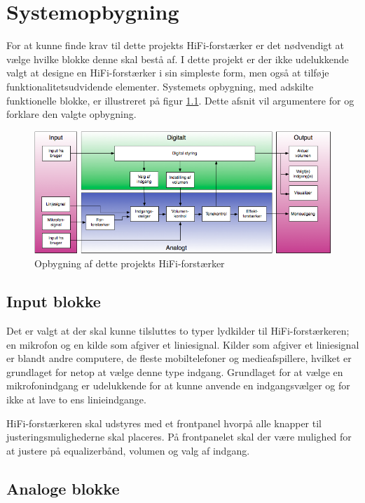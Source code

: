 \chapter{Systemopbygning}
For at kunne finde krav til dette projekts HiFi-forstærker er det nødvendigt at vælge hvilke blokke denne skal bestå af. I dette projekt er der ikke udelukkende valgt at designe en HiFi-forstærker i sin simpleste form, men også at tilføje funktionalitetsudvidende elementer. Systemets opbygning, med adskilte funktionelle blokke, er illustreret på figur \ref{fig:hififorstaerker_opbygning}. Dette afsnit vil argumentere for og forklare den valgte opbygning. 


\begin{figure}[h]
\centering
\includegraphics[scale=0.6]{valg_af_loesning/systemopbygning/forstaerker_opbygning.png}
\caption{Opbygning af dette projekts HiFi-forstærker}
\label{fig:hififorstaerker_opbygning}
\end{figure}


\section*{Input blokke}
Det er valgt at der skal kunne tilsluttes to typer lydkilder til HiFi-forstærkeren; en mikrofon og en kilde som afgiver et liniesignal. Kilder som afgiver et liniesignal er blandt andre computere, de fleste mobiltelefoner og medieafspillere, hvilket er grundlaget for netop at vælge denne type indgang. 
Grundlaget for at vælge en mikrofonindgang er udelukkende for at kunne anvende en indgangsvælger og for ikke at lave to ens linieindgange. 

HiFi-forstærkeren skal udstyres med et frontpanel hvorpå alle knapper til justeringsmulighederne skal placeres. På frontpanelet skal der være mulighed for at justere på equalizerbånd, volumen og valg af indgang.

\section*{Analoge blokke}

